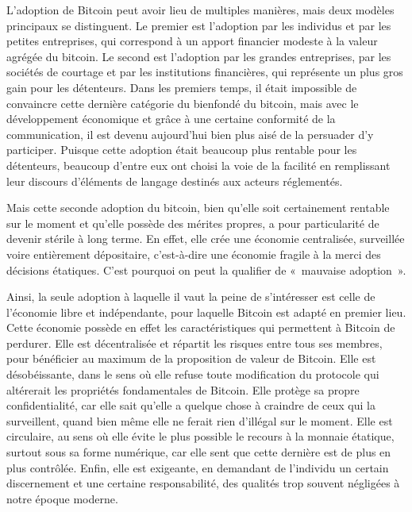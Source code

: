 L'adoption de Bitcoin peut avoir lieu de multiples manières, mais deux modèles principaux se distinguent. Le premier est l'adoption par les individus et par les petites entreprises, qui correspond à un apport financier modeste à la valeur agrégée du bitcoin. Le second est l'adoption par les grandes entreprises, par les sociétés de courtage et par les institutions financières, qui représente un plus gros gain pour les détenteurs. Dans les premiers temps, il était impossible de convaincre cette dernière catégorie du bienfondé du bitcoin, mais avec le développement économique et grâce à une certaine conformité de la communication, il est devenu aujourd'hui bien plus aisé de la persuader d'y participer. Puisque cette adoption était beaucoup plus rentable pour les détenteurs, beaucoup d'entre eux ont choisi la voie de la facilité en remplissant leur discours d'éléments de langage destinés aux acteurs réglementés.

Mais cette seconde adoption du bitcoin, bien qu'elle soit certainement rentable sur le moment et qu'elle possède des mérites propres, a pour particularité de devenir stérile à long terme. En effet, elle crée une économie centralisée, surveillée voire entièrement dépositaire, c'est-à-dire une économie fragile à la merci des décisions étatiques. C'est pourquoi on peut la qualifier de «~mauvaise adoption~».

Ainsi, la seule adoption à laquelle il vaut la peine de s'intéresser est celle de l'économie libre et indépendante, pour laquelle Bitcoin est adapté en premier lieu. Cette économie possède en effet les caractéristiques qui permettent à Bitcoin de perdurer. Elle est décentralisée et répartit les risques entre tous ses membres, pour bénéficier au maximum de la proposition de valeur de Bitcoin. Elle est désobéissante, dans le sens où elle refuse toute modification du protocole qui altérerait les propriétés fondamentales de Bitcoin. Elle protège sa propre confidentialité, car elle sait qu'elle a quelque chose à craindre de ceux qui la surveillent, quand bien même elle ne ferait rien d'illégal sur le moment. Elle est circulaire, au sens où elle évite le plus possible le recours à la monnaie étatique, surtout sous sa forme numérique, car elle sent que cette dernière est de plus en plus contrôlée. Enfin, elle est exigeante, en demandant de l'individu un certain discernement et une certaine responsabilité, des qualités trop souvent négligées à notre époque moderne.

